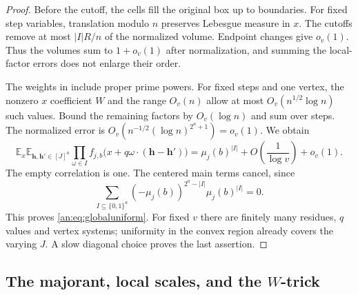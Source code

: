 \documentclass[11pt,reqno]{amsart}
\theoremstyle{definition}
\numberwithin{equation}{section}
\def\l{\left}
\def\r{\right}
\def\f{\frac}
\begin{document}
\begin{proof}
Before the cutoff, the cells fill the original box up to boundaries. For fixed step variables, translation modulo $n$ preserves Lebesgue measure in $x$. The cutoffs remove at most $|I|R/n$ of the normalized volume. Endpoint changes give $o_v(1)$. Thus the volumes sum to $1+o_v(1)$ after normalization, and summing the local-factor errors does not enlarge their order.

The weights in \cite{FT} include proper prime powers. For fixed steps and one vertex, the nonzero $x$ coefficient $W$ and the range $O_v(n)$ allow at most $O_v(n^{1/2}\log n)$ such values. Bound the remaining factors by $O_v(\log n)$ and sum over steps. The normalized error is $O_v(n^{-1/2}(\log n)^{2^a+1})=o_v(1)$. We obtain
\[
 \mathbb E_x\mathbb E_{\boldsymbol h,\boldsymbol h'\in[J]^a}
 \prod_{\omega\in I}
 f_{j,b}\bigl(x+q\omega\cdot(\boldsymbol h-\boldsymbol h')\bigr)
 =\mu_j(b)^{|I|}+O\l(\f1{\log v}\r)+o_v(1).
\]
The empty correlation is one. The centered main terms cancel, since
\[
 \sum_{I\subseteq\{0,1\}^a}
  (-\mu_j(b))^{2^a-|I|}\mu_j(b)^{|I|}=0.
\]
This proves \eqref{an:eq:globaluniform}. For fixed $v$ there are finitely many residues, $q$ values and vertex systems; uniformity in the convex region already covers the varying $J$. A slow diagonal choice proves the last assertion.
\end{proof}

\subsection{The majorant, local scales, and the \texorpdfstring{$W$}{W}-trick}
\end{document}
